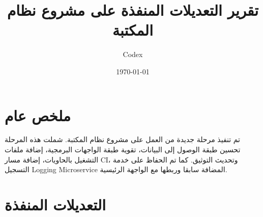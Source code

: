 \documentclass[12pt,a4paper]{article}
\title{تقرير التعديلات المنفذة على مشروع نظام المكتبة}
\author{Codex}
\date{\today}
\begin{document}
\maketitle

\section{ملخص عام}

تم تنفيذ مرحلة جديدة من العمل على مشروع نظام المكتبة. شملت هذه المرحلة تحسين طبقة الوصول إلى البيانات، تقوية طبقة الواجهات البرمجية، إضافة ملفات التشغيل بالحاويات، إضافة مسار CI، وتحديث التوثيق. كما تم الحفاظ على خدمة التسجيل \textenglish{Logging Microservice} المضافة سابقا وربطها مع الواجهة الرئيسية.

\section{التعديلات المنفذة}
\end{document}
